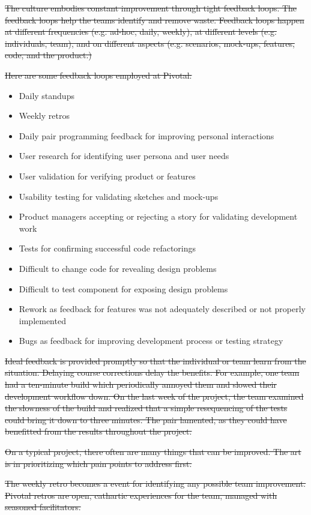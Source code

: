 \sout{The culture embodies constant improvement through tight feedback loops. The feedback loops help the teams identify and remove waste. Feedback loops happen at different frequencies (e.g. ad-hoc, daily, weekly), at different levels (e.g. individuals, team), and on different aspects (e.g. scenarios, mock-ups, features, code, and the product.)}


\sout{Here are some feedback loops employed at Pivotal:}
\begin{itemize}
  \item Daily standups
  \item Weekly retros
  \item Daily pair programming feedback for improving personal interactions
  \item User research for identifying user persona and user needs
  \item User validation for verifying product or features
  \item Usability testing for validating sketches and mock-ups
  \item Product managers accepting or rejecting a story for validating development work
  \item Tests for confirming successful code refactorings 
  \item Difficult to change code for revealing design problems
  \item Difficult to test component for exposing design problems
  \item Rework as feedback for features was not adequately described or not properly implemented
  \item Bugs as feedback for improving development process or testing strategy 
\end{itemize}


\sout{Ideal feedback is provided promptly so that the individual or team learn from the situation. Delaying course corrections delay the benefits. For example, one team had a ten-minute build which periodically annoyed them and slowed their development workflow down. On the last week of the project, the team examined the slowness of the build and realized that a simple resequencing of the tests could bring it down to three minutes. The pair lamented,  as they could have benefitted from the results throughout the project. }


\sout{On a typical project, there often are many things that can be improved. The art is in prioritizing which pain points to address first. }


\sout{The weekly retro becomes a  event for identifying any possible team improvement. Pivotal retros are open, cathartic experiences for the team, managed with seasoned facilitators. }


